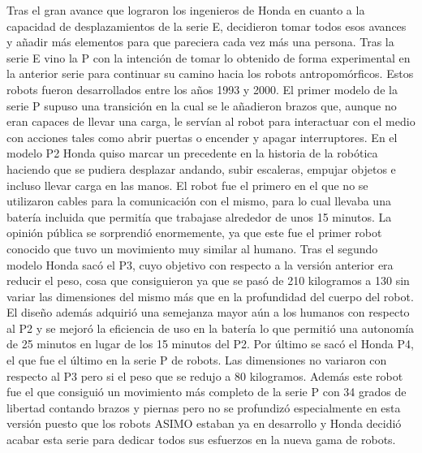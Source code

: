 Tras el gran avance que lograron los ingenieros de Honda en cuanto a la capacidad de desplazamientos de la serie E, decidieron tomar todos esos avances y añadir más elementos para que pareciera cada vez más una persona. Tras la serie E vino la P con la intención de tomar lo obtenido de forma experimental en la anterior serie para continuar su camino hacia los robots antropomórficos. Estos robots fueron desarrollados entre los años 1993 y 2000. El primer modelo de la serie P supuso una transición en la cual se le añadieron brazos que, aunque no eran capaces de llevar una carga, le servían al robot para interactuar con el medio con acciones tales como abrir puertas o encender y apagar interruptores. En el modelo P2 Honda quiso marcar un precedente en la historia de la robótica haciendo que se pudiera desplazar andando, subir escaleras, empujar objetos e incluso llevar carga en las manos. El robot fue el primero en el que no se utilizaron cables para la comunicación con el mismo, para lo cual llevaba una batería incluida que permitía que trabajase alrededor de unos 15 minutos. La opinión pública se sorprendió enormemente, ya que este fue el primer robot conocido que tuvo un movimiento muy similar al humano. Tras el segundo modelo Honda sacó el P3, cuyo objetivo con respecto a la versión anterior era reducir el peso, cosa que consiguieron ya que se pasó de 210 kilogramos a 130 sin variar las dimensiones del mismo más que en la profundidad del cuerpo del robot. El diseño además adquirió una semejanza mayor aún a los humanos con respecto al P2 y se mejoró la eficiencia de uso en la batería lo que permitió una autonomía de 25 minutos en lugar de los 15 minutos del P2. Por último se sacó el Honda P4, el que fue el último en la serie P de robots. Las dimensiones no variaron con respecto al P3 pero si el peso que se redujo a 80 kilogramos. Además este robot fue el que consiguió un movimiento más completo de la serie P con 34 grados de libertad contando brazos y piernas pero no se profundizó especialmente en esta versión puesto que los robots ASIMO estaban ya en desarrollo y Honda decidió acabar esta serie para dedicar todos sus esfuerzos en la nueva gama de robots.

\vspace{10px}

